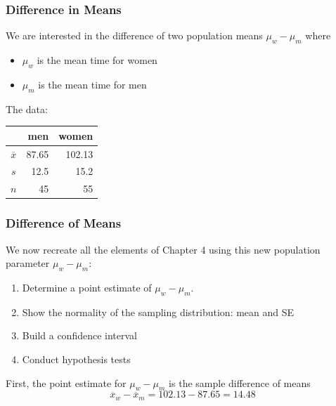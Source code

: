 \documentclass[handout]{beamer}
\newcommand{\blue}[1]{\textcolor{blue2}{#1}}
\newcommand{\xbar}{\overline{x}}
\begin{document}
\begin{frame}[fragile]
\frametitle{Difference in Means}
We are interested in the difference of two population means $\mu_w - \mu_m$ where
\pause\begin{itemize}
\item $\mu_w$ is the mean time for women
\item $\mu_m$ is the mean time for men
\end{itemize}

\pause\vspace{0.5cm}
The data:
\begin{center}
  \begin{tabular}{c|rr}
     & men & women \\ 
\hline
    $\overline{x}$ & 87.65 & 102.13 \\ 
    $s$ & 12.5 & 15.2 \\ 
    $n$ & 45 & 55 \\ 
\end{tabular}
\end{center}

\end{frame}


\begin{frame}[fragile]
\frametitle{Difference of Means}
We now recreate all the elements of Chapter 4 using this new \blue{population parameter}  $\mu_w - \mu_m$:

\vspace{0.25cm}

\begin{enumerate}
\pause\item Determine a point estimate of $\mu_w - \mu_m$.
\pause\item Show the normality of the sampling distribution:  mean and SE
\pause\item Build a confidence interval
\pause\item Conduct hypothesis tests
\end{enumerate}

\vspace{0.25cm}

\pause First, the \blue{point estimate} for $\mu_w - \mu_m$ is the \blue{sample difference of means}
\[\xbar_w - \xbar_m = 102.13-87.65=14.48\]



\end{frame}
\end{document}
